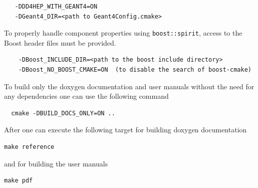 \begin{verbatim}
   -DDD4HEP_WITH_GEANT4=ON
   -DGeant4_DIR=<path to Geant4Config.cmake>
\end{verbatim}

To properly handle component properties using \texttt{boost::spirit}, access to the Boost header files must be provided.
\begin{verbatim}
    -DBoost_INCLUDE_DIR=<path to the boost include directory>
    -DBoost_NO_BOOST_CMAKE=ON  (to disable the search of boost-cmake)
\end{verbatim}

To build only the doxygen documentation and user manuals without the need for any dependencies one can use the following command
\begin{verbatim}
  cmake -DBUILD_DOCS_ONLY=ON ..
\end{verbatim}
After one can execute the following target for building doxygen documentation
\begin{verbatim}
make reference
\end{verbatim}
and for building the user manuals
\begin{verbatim}
make pdf
\end{verbatim}

